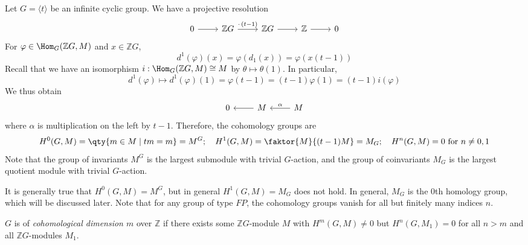 \begin{example}
    Let \( G = \langle t \rangle \) be an infinite cyclic group.
    We have a projective resolution
\[\begin{tikzcd}
	0 & {\mathbb Z G} & {\mathbb Z G} & {\mathbb Z} & 0
	\arrow[from=1-1, to=1-2]
	\arrow["{\cdot\,(t-1)}", from=1-2, to=1-3]
	\arrow[from=1-3, to=1-4]
	\arrow[from=1-4, to=1-5]
\end{tikzcd}\]
    For \( \varphi \in \Hom_G(\mathbb Z G, M) \) and \( x \in \mathbb Z G \),
    \[ d^1(\varphi)(x) = \varphi(d_1(x)) = \varphi(x(t-1)) \]
    Recall that we have an isomorphism \( i : \Hom_G(\mathbb Z G, M) \cong M \) by \( \theta \mapsto \theta(1) \).
    In particular,
    \[ d^1(\varphi) \mapsto d^1(\varphi)(1) = \varphi(t-1) = (t - 1)\varphi(1) = (t - 1) i(\varphi) \]
    We thus obtain
\[\begin{tikzcd}
	0 & M & M
	\arrow["\alpha"', from=1-3, to=1-2]
	\arrow[from=1-2, to=1-1]
\end{tikzcd}\]
    where \( \alpha \) is multiplication on the left by \( t - 1 \).
    Therefore, the cohomology groups are
    \[ H^0(G, M) = \qty{m \in M \mid tm = m} = M^G;\quad H^1(G, M) = \faktor{M}{(t-1)M} = M_G;\quad H^n(G, M) = 0 \text{ for } n \neq 0, 1 \]
    Note that the group of invariants \( M^G \) is the largest submodule with trivial \( G \)-action, and the group of coinvariants \( M_G \) is the largest quotient module with trivial \( G \)-action.
\end{example}
\begin{remark}
    It is generally true that \( H^0(G, M) = M^G \), but in general \( H^1(G, M) = M_G \) does not hold.
    In general, \( M_G \) is the \( 0 \)th homology group, which will be discussed later.
    Note that for any group of type \( FP \), the cohomology groups vanish for all but finitely many indices \( n \).
\end{remark}
\begin{definition}
    \( G \) is of \emph{cohomological dimension \( m \)} over \( \mathbb Z \) if there exists some \( \mathbb Z G \)-module \( M \) with \( H^m(G, M) \neq 0 \) but \( H^n(G, M_1) = 0 \) for all \( n > m \) and all \( \mathbb Z G \)-modules \( M_1 \).
\end{definition}
